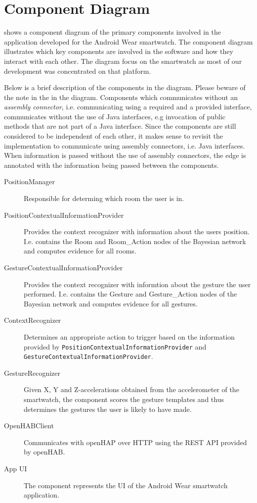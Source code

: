 \section{Component Diagram}
\label{sec:implementation:component-diagram}

 shows a component diagram of the primary components involved in the application developed for the Android Wear smartwatch. The component diagram illustrates which key components are involved in the software and how they interact with each other.
The diagram focus on the smartwatch as most of our development was concentrated on that platform.

Below is a brief description of the components in the diagram. Please beware of the note in the in the diagram. Components which communicates without an \emph{assembly connector}, i.e. communicating using a required and a provided interface, communicates without the use of Java interfaces, e.g invocation of public methods that are not part of a Java interface. Since the components are still considered to be independent of each other, it makes sense to revisit the implementation to communicate using assembly connectors, i.e. Java interfaces. When information is passed without the use of assembly connectors, the edge is annotated with the information being passed between the components.

\begin{description}
\item[PositionManager] Responsible for determing which room the user is in.
\item[PositionContextualInformationProvider] Provides the context recognizer with information about the users position. I.e. contains the Room and Room\_Action nodes of the Bayesian network and computes evidence for all rooms.
\item[GestureContextualInformationProvider] Provides the context recognizer with informtion about the gesture the user performed. I.e. contains the Gesture and Gesture\_Action nodes of the Bayesian network and computes evidence for all gestures.
\item[ContextRecognizer] Determines an appropriate action to trigger based on the information provided by \texttt{PositionContextualInformationProvider} and \texttt{GestureContextualInformationProvider}.
\item[GestureRecognizer] Given X, Y and Z-accelerations obtained from the accelerometer of the smartwatch, the component scores the gesture templates and thus determines the gestures the user is likely to have made.
\item[OpenHABClient] Communicates with openHAP over HTTP using the REST API provided by openHAB.
\item[App UI] The component represents the UI of the Android Wear smartwatch application.
\end{description}

